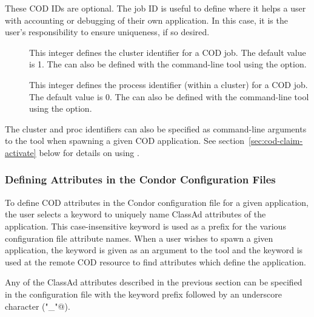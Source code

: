 These COD IDs are optional.
The job ID is useful to define where it helps a
user with accounting or debugging of their own application.
In this case, it is the user's responsibility to ensure uniqueness,
if so desired.
  
\begin{description}
 \item[] This integer defines the
   cluster identifier for a COD job.
   The default value is 1.
   The  can also be defined with the
    command-line tool using the 
   option.

 \item[]  This integer defines the
   process identifier (within a cluster) for a COD job.
   The default value is 0.
   The  can also be defined with the
    command-line tool using the 
   option.

\end{description}

\Note The cluster and proc identifiers can also be specified as
command-line arguments to the  tool when
spawning a given COD application.
See section~\ref{sec:cod-claim-activate} below for details on using
. 


\subsubsection{\label{sec:cod-config-attrs}
Defining Attributes in the Condor Configuration Files}


To define COD attributes in the Condor configuration file for a given
application, the user selects a keyword to uniquely name 
ClassAd attributes of the application.
This case-insensitive keyword is used as a prefix for the various
configuration file attribute names.
When a user wishes to spawn a given application, the
keyword is given as an argument to the  tool and the keyword
is used at the remote COD resource to find attributes which define the
application.

Any of the ClassAd attributes described in the previous section can be
specified in the configuration file with the keyword prefix followed
by an underscore character (\verb@"_"@).


